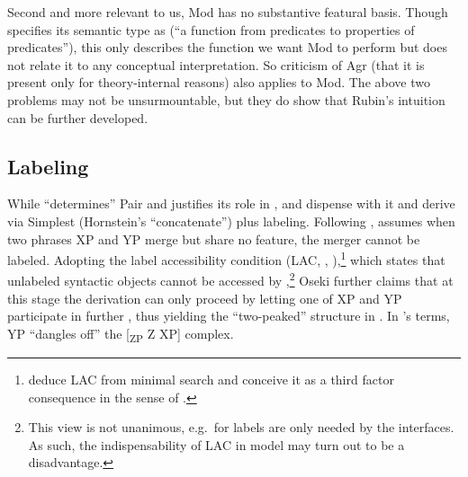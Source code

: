 \documentclass[output=paper]{langsci/langscibook}
\begin{document}
\ea\label{ex:modi}
\z

Second and more relevant to us, Mod has no substantive featural basis. Though
\citet[666]{Rubin2003} specifies its semantic type as
 (``a function from
predicates to properties of predicates''), this only describes the function we
want Mod to perform but does not relate it to any conceptual interpretation. So
 criticism of Agr (that it is present only for
theory-internal reasons) also applies to Mod. The above two problems may not be
unsurmountable, but they do show that Rubin's intuition can be further
developed.


\subsection{Labeling}\label{sec3.2}

While \citet{Rubin2003} ``determines'' Pair  and justifies its role in
, \citet{Hornstein2009} and \citet{Oseki2015} dispense with it and
derive  via Simplest  (Hornstein's ``concatenate'') plus
labeling. %
%
Following \citet{EpsteinEtal2012}, \citet{Oseki2015} assumes when two phrases
XP and YP merge but share no feature, the merger cannot be labeled. Adopting
the label accessibility condition (LAC, \citealt[90]{Hornstein2009},
\citealt[254]{EpsteinEtal2012}),\footnote{\citet[262]{EpsteinEtal2012} deduce
    LAC from minimal search and conceive it as a third factor consequence in
    the sense of \citet{Chomsky2005}.} which states that unlabeled syntactic
    objects cannot be accessed by ,\footnote{This view is not unanimous,
        e.g.\ for \citet{Chomsky2013} labels are only needed by the interfaces.
    As such, the indispensability of LAC in 
model may turn out to be a disadvantage.} Oseki further claims that at this
stage the derivation can only proceed by letting one of XP and YP participate
in further , thus yielding the ``two-peaked'' structure in .
In \citeauthor{Hornstein2009}'s terms, YP ``dangles off'' the
[\textsubscript{ZP} Z XP] complex.
\end{document}
